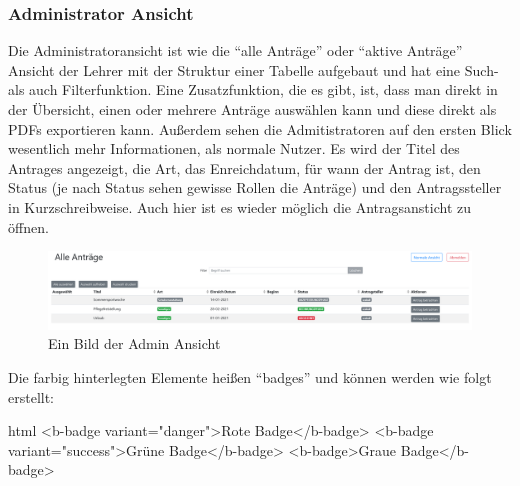 \subsubsection{Administrator Ansicht}
Die Administratoransicht ist wie die \enquote{alle Anträge} oder \enquote{aktive Anträge} Ansicht der Lehrer mit der Struktur einer Tabelle aufgebaut und hat eine Such- als auch Filterfunktion. Eine Zusatzfunktion, die es gibt, ist, dass man direkt in der Übersicht, einen oder mehrere Anträge auswählen kann und diese direkt als PDFs exportieren kann. Außerdem sehen die Admitistratoren auf den ersten Blick wesentlich mehr Informationen, als normale Nutzer. Es wird der Titel des Antrages angezeigt, die Art, das Enreichdatum, für wann der Antrag ist, den Status (je nach Status sehen gewisse Rollen die Anträge) und den Antragssteller in Kurzschreibweise. Auch hier ist es wieder möglich die Antragsansticht zu öffnen.
\begin{figure}[H]
	\centering
	\includegraphics[width=1\linewidth]{images/website/admin}
	\caption[Aktiv]{Ein Bild der Admin Ansicht}
	\label{fig:adminview}
\end{figure}
Die farbig hinterlegten Elemente heißen \enquote{badges} und können werden wie folgt erstellt:
\begin{code}{html}
	<b-badge variant="danger">Rote Badge</b-badge>
	<b-badge variant="success">Grüne Badge</b-badge>
	<b-badge>Graue Badge</b-badge>
\end{code}
	\label{list:badgebsp} ~\\
~\\

\newpage
